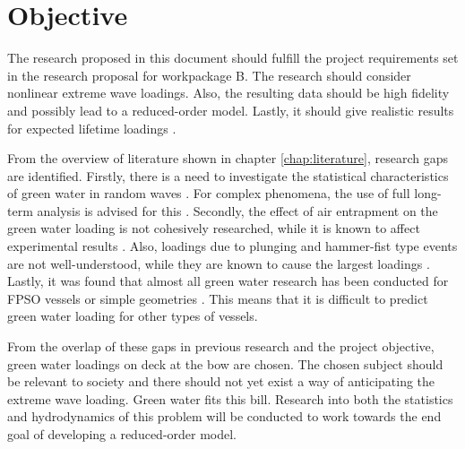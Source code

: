 \nopagebreak
\chapter{Objective}
\label{chap:objective}
The research proposed in this document should fulfill the project requirements set in the research proposal for workpackage B. The research should consider nonlinear extreme wave loadings. Also, the resulting data should be high fidelity and possibly lead to a reduced-order model. Lastly, it should give realistic results for expected lifetime loadings \cite{ResearchProposal2020}.
\par 
From the overview of literature shown in chapter \ref{chap:literature}, research gaps are identified. Firstly, there is a need to investigate the statistical characteristics of green water in random waves \cite{Mori2003, Chuang2018}. For complex phenomena, the use of full long-term analysis is advised for this \cite{Baarholm2010}.  Secondly, the effect of air entrapment on the green water loading is not cohesively researched, while it is known to affect experimental results \cite{Chuang2019, Greco2005}. Also, loadings due to plunging and hammer-fist type events are not well-understood, while they are known to cause the largest loadings \cite{Ariyarathne2012}. Lastly, it was found that almost all green water research has been conducted for FPSO vessels or simple geometries \cite{Chuang2019}. This means that it is difficult to predict green water loading for other types of vessels.
\par 
From the overlap of these gaps in previous research and the project objective, green water loadings on deck at the bow are chosen. 
The chosen subject should be relevant to society and there should not yet exist a way of anticipating the extreme wave loading. Green water fits this bill. Research into both the statistics and hydrodynamics of this problem will be conducted to work towards the end goal of developing a reduced-order model.

